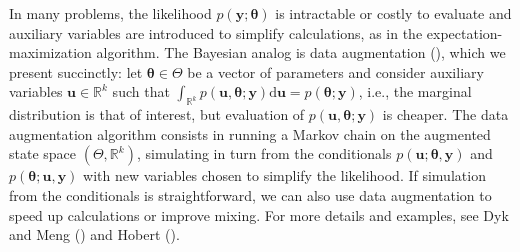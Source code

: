 \documentclass[
  11pt,
  letterpaper,
]{scrbook}
\theoremstyle{definition}
\theoremstyle{definition}
\theoremstyle{definition}
\theoremstyle{plain}
\theoremstyle{plain}
\theoremstyle{remark}
\begin{document}
In many problems, the likelihood
\(p(\boldsymbol{y}; \boldsymbol{\theta})\) is intractable or costly to
evaluate and auxiliary variables are introduced to simplify
calculations, as in the expectation-maximization algorithm. The Bayesian
analog is data augmentation (), which we present succinctly: let
\(\boldsymbol{\theta} \in \Theta\) be a vector of parameters and
consider auxiliary variables \(\boldsymbol{u} \in \mathbb{R}^k\) such
that
\(\int_{\mathbb{R}^k} p(\boldsymbol{u}, \boldsymbol{\theta}; \boldsymbol{y}) \mathrm{d} \boldsymbol{u} = p(\boldsymbol{\theta}; \boldsymbol{y})\),
i.e., the marginal distribution is that of interest, but evaluation of
\(p(\boldsymbol{u}, \boldsymbol{\theta}; \boldsymbol{y})\) is cheaper.
The data augmentation algorithm consists in running a Markov chain on
the augmented state space \((\Theta, \mathbb{R}^k)\), simulating in turn
from the conditionals
\(p(\boldsymbol{u}; \boldsymbol{\theta}, \boldsymbol{y})\) and
\(p(\boldsymbol{\theta}; \boldsymbol{u}, \boldsymbol{y})\) with new
variables chosen to simplify the likelihood. If simulation from the
conditionals is straightforward, we can also use data augmentation to
speed up calculations or improve mixing. For more details and examples,
see Dyk and Meng () and Hobert
().
\end{document}
